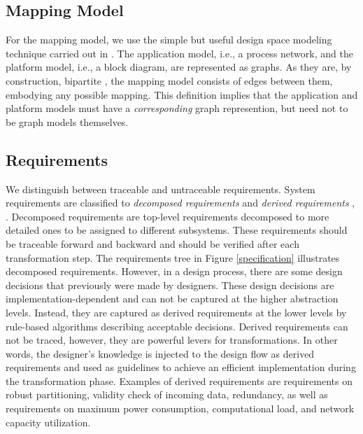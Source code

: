\subsection{Mapping Model}
\label{sec:mapping model}

For the mapping model, we use the simple but useful design space modeling technique carried out in \cite{blickle1998system}. The application model, i.e., a process network, and the platform model, i.e., a block diagram, are represented as graphs.
As they are, by construction, bipartite \cite{diestel2010graph}, the mapping model consists of edges between them, embodying any possible mapping. This
definition implies that the application and platform models must have
a \emph{corresponding} graph represention, but need not to be graph models
themselves.

\subsection{Requirements}
\label{sec:requirements}

We distinguish between traceable and untraceable requirements. System requirements are classified to \textit{decomposed requirements} and \textit{derived requirements} \cite{johnson1998178b}, \cite{landi2011arp4754a}. Decomposed requirements are top-level requirements decomposed to more detailed ones to be assigned to different subsystems. These requirements should be traceable forward and backward and should be verified after each transformation step. The requirements tree in Figure \ref{specification} illustrates decomposed requirements. However, in a design process, there are some design decisions that previously were made by designers. These design decisions are implementation-dependent and can not be captured at the higher abstraction levels. Instead, they are captured as derived requirements at the lower levels by rule-based algorithms describing acceptable decisions. Derived requirements can not be traced, however, they are powerful levers for transformations. In other words, the designer's knowledge is injected to the design flow as derived requirements and used as guidelines to achieve an efficient implementation during the transformation phase. Examples of derived requirements are requirements on robust partitioning, validity check of incoming data, redundancy, as well as requirements on maximum power consumption, computational load, and  network capacity utilization. 


